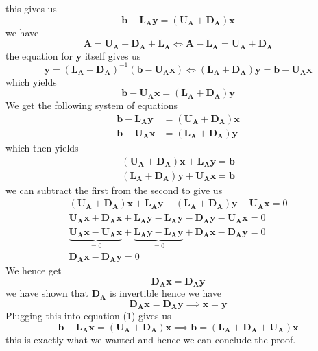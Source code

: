 \documentclass{article}
\newcommand\DA{\mathbf{D}_{\mathbf{A}}}
\newcommand\LA{\mathbf{L}_{\mathbf{A}}}
\newcommand\UA{\mathbf{U}_{\mathbf{A}}}
\begin{document}
this gives us
\begin{equation}
    \mathbf{b} - \LA\mathbf{y} = \left(\UA + \DA\right)\mathbf{x}
\end{equation}
 we have 
\begin{equation*}
    \mathbf{A} = \UA + \DA + \LA \Longleftrightarrow \mathbf{A} - \LA = \UA + \DA
\end{equation*}
the equation for $\mathbf{y}$ itself gives us
\begin{equation*}
    \mathbf{y} = \left(\LA + \DA\right)^{-1}\left(\mathbf{b}- \UA \mathbf{x}\right) \Longleftrightarrow  \left(\LA + \DA\right)\mathbf{y} = \mathbf{b}- \UA \mathbf{x} 
\end{equation*}
which yields
\begin{equation}
    \mathbf{b}- \UA \mathbf{x} = \left(\LA + \DA\right)\mathbf{y}
\end{equation}
We get the following system of equations
\begin{align*}
     \mathbf{b} - \LA\mathbf{y} &= \left(\UA + \DA\right)\mathbf{x} \\
     \mathbf{b}- \UA \mathbf{x} &= \left(\LA + \DA\right)\mathbf{y}
\end{align*}
which then yields
\begin{align*}
    \left(\UA + \DA\right)\mathbf{x} + \LA\mathbf{y} = \mathbf{b} \\
    \left(\LA + \DA\right)\mathbf{y} + \UA\mathbf{x} = \mathbf{b}
\end{align*}
we can subtract the first from the second to give us
\begin{align*}
     \left(\UA + \DA\right)\mathbf{x} + \LA\mathbf{y} -\left(\LA + \DA\right)\mathbf{y} - \UA\mathbf{x} =0 \\
     \UA\mathbf{x} + \DA\mathbf{x} + \LA\mathbf{y} - \LA\mathbf{y} - \DA \mathbf{y} - \UA\mathbf{x} = 0 \\
     \underbrace{\UA \mathbf{x} - \UA \mathbf{x}}_{=0} + \underbrace{\LA\mathbf{y} - \LA\mathbf{y}}_{=0} + \DA\mathbf{x} - \DA\mathbf{y} = 0 \\
     \DA\mathbf{x} - \DA\mathbf{y} = 0 
\end{align*}
We hence get 
\begin{equation*}
    \DA\mathbf{x} = \DA\mathbf{y}
\end{equation*}
we have shown that $\DA$ is invertible hence we have
\begin{equation*}
    \DA\mathbf{x} = \DA\mathbf{y} \implies \mathbf{x} = \mathbf{y}
\end{equation*}
Plugging this into equation (1) gives us
\begin{equation*}
    \mathbf{b} - \LA\mathbf{x} = \left(\UA + \DA\right)\mathbf{x} \implies \mathbf{b} = \left(\LA + \DA + \UA\right)\mathbf{x}
\end{equation*}
this is exactly what we wanted and hence we can conclude the proof.
\end{document}
